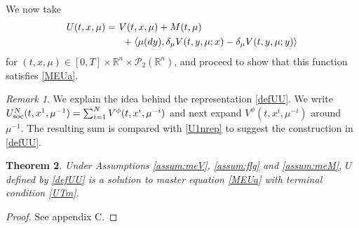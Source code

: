 \documentclass{amsart}
\newtheorem{theorem}{Theorem}[section]
\theoremstyle{definition}
\theoremstyle{remark}
\newtheorem{remark}[theorem]{Remark}
\def\cal{\mathcal}
\numberwithin{equation}{section}
\begin{document}
  We now take
 \begin{align}
 U(t, x, \mu)=\ &  V(t, x, \mu) + M(t, \mu) \label{defUU}   \\
   & \ + \langle \mu(dy),  \delta_\mu  V(t, y,\mu; x)- \delta_\mu  V(t, y,\mu; y)      \rangle \notag
 \end{align}
 for $(t,x,\mu)\in [0,T]\times \mathbb{R}^n\times
 {\cal P}_2(\mathbb{R}^n) $, and  proceed to show that this function satisfies \eqref{MEUa}.

\begin{remark}
We explain the idea behind the representation \eqref{defUU}.
We write $U^{N}_{\rm soc }(t,x^1, \mu^{-1})= \sum_{i=1}^N V^\phi (t, x^i, \mu^{-i}) $ and next expand $V^\phi(t, x^i, \mu^{-i})$ around $\mu^{-1}$.
The resulting sum is compared with \eqref{U1nrep} to suggest the construction in  \eqref{defUU}.
\end{remark}



\begin{theorem}\label{theorem:U}
Under Assumptions \ref{assum:meV}, \ref{assum:flg} and \ref{assum:meM},
 $U$  defined by \eqref{defUU} is a solution to  master equation   \eqref{MEUa}
 with terminal condition \eqref{UTm}.
\end{theorem}
\begin{proof}
See appendix C.
\end{proof}

\end{document}
